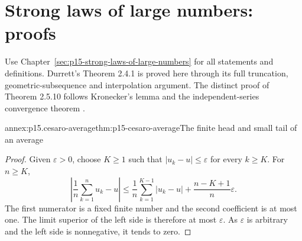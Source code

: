 \section{Strong laws of large numbers: proofs}
\label{sec:annex-p15-strong-laws-of-large-numbers}

Use Chapter~\ref{sec:p15-strong-laws-of-large-numbers} for all statements
and definitions. Durrett's Theorem 2.4.1 is proved here through its full
truncation, geometric-subsequence and interpolation argument. The
distinct proof of Theorem 2.5.10 follows Kronecker's lemma and the
independent-series convergence theorem
\cite[pp.~76--78, 85--87]{DurrettPTEAuthor2019}.

\begin{annexitem}{annex:p15.cesaro-average}{thm:p15-cesaro-average}{The finite head and small tail of an average}
\begin{proof}
Given \(\varepsilon>0\), choose \(K\geq1\) such that
\(|u_k-u|\leq\varepsilon\) for every \(k\geq K\). For
\(n\geq K\),
\[
 \left|\frac1n\sum_{k=1}^nu_k-u\right|
 \leq\frac1n\sum_{k=1}^{K-1}|u_k-u|
                          +\frac{n-K+1}{n}\varepsilon.
\]
The first numerator is a fixed finite number and the second coefficient
is at most one. The limit superior of the left side is therefore at
most \(\varepsilon\). As \(\varepsilon\) is arbitrary and
the left side is nonnegative, it tends to zero.
\end{proof}
\end{annexitem}

